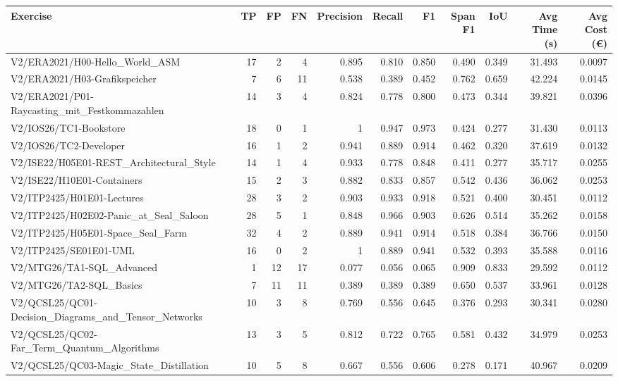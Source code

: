 \begin{tabular}{lrrrrrrrrrr}
Exercise & TP & FP & FN & Precision & Recall & F1 & Span F1 & IoU & Avg Time (s) & Avg Cost (€) \\
\hline
V2/ERA2021/H00-Hello\_World\_ASM & 17 & 2 & 4 & 0.895 & 0.810 & 0.850 & 0.490 & 0.349 & 31.493 & 0.0097 \\
V2/ERA2021/H03-Grafikspeicher & 7 & 6 & 11 & 0.538 & 0.389 & 0.452 & 0.762 & 0.659 & 42.224 & 0.0145 \\
V2/ERA2021/P01-Raycasting\_mit\_Festkommazahlen & 14 & 3 & 4 & 0.824 & 0.778 & 0.800 & 0.473 & 0.344 & 39.821 & 0.0396 \\
V2/IOS26/TC1-Bookstore & 18 & 0 & 1 & 1 & 0.947 & 0.973 & 0.424 & 0.277 & 31.430 & 0.0113 \\
V2/IOS26/TC2-Developer & 16 & 1 & 2 & 0.941 & 0.889 & 0.914 & 0.462 & 0.320 & 37.619 & 0.0132 \\
V2/ISE22/H05E01-REST\_Architectural\_Style & 14 & 1 & 4 & 0.933 & 0.778 & 0.848 & 0.411 & 0.277 & 35.717 & 0.0255 \\
V2/ISE22/H10E01-Containers & 15 & 2 & 3 & 0.882 & 0.833 & 0.857 & 0.542 & 0.436 & 36.062 & 0.0253 \\
V2/ITP2425/H01E01-Lectures & 28 & 3 & 2 & 0.903 & 0.933 & 0.918 & 0.521 & 0.400 & 30.451 & 0.0112 \\
V2/ITP2425/H02E02-Panic\_at\_Seal\_Saloon & 28 & 5 & 1 & 0.848 & 0.966 & 0.903 & 0.626 & 0.514 & 35.262 & 0.0158 \\
V2/ITP2425/H05E01-Space\_Seal\_Farm & 32 & 4 & 2 & 0.889 & 0.941 & 0.914 & 0.518 & 0.384 & 36.766 & 0.0150 \\
V2/ITP2425/SE01E01-UML & 16 & 0 & 2 & 1 & 0.889 & 0.941 & 0.532 & 0.393 & 35.588 & 0.0116 \\
V2/MTG26/TA1-SQL\_Advanced & 1 & 12 & 17 & 0.077 & 0.056 & 0.065 & 0.909 & 0.833 & 29.592 & 0.0112 \\
V2/MTG26/TA2-SQL\_Basics & 7 & 11 & 11 & 0.389 & 0.389 & 0.389 & 0.650 & 0.537 & 33.961 & 0.0128 \\
V2/QCSL25/QC01-Decision\_Diagrams\_and\_Tensor\_Networks & 10 & 3 & 8 & 0.769 & 0.556 & 0.645 & 0.376 & 0.293 & 30.341 & 0.0280 \\
V2/QCSL25/QC02-Far\_Term\_Quantum\_Algorithms & 13 & 3 & 5 & 0.812 & 0.722 & 0.765 & 0.581 & 0.432 & 34.979 & 0.0253 \\
V2/QCSL25/QC03-Magic\_State\_Distillation & 10 & 5 & 8 & 0.667 & 0.556 & 0.606 & 0.278 & 0.171 & 40.967 & 0.0209 \\
\end{tabular}
